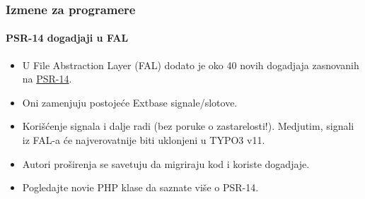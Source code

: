 \begin{frame}[fragile]
	\frametitle{Izmene za programere}
	\framesubtitle{PSR-14 dogadjaji u FAL}

	\lstset{basicstyle=\tiny\ttfamily}

	\begin{itemize}
		\item U File Abstraction Layer (FAL) dodato je oko 40 novih dogadjaja zasnovanih na
			\href{https://www.php-fig.org/psr/psr-14/}{PSR-14}.
		\item Oni zamenjuju postojeće Extbase signale/slotove.
		\item Korišćenje signala i dalje radi (bez poruke o zastarelosti!).
			Medjutim, signali iz FAL-a će najverovatnije biti uklonjeni u TYPO3 v11.
		\item Autori proširenja se savetuju da migriraju kod i koriste dogadjaje.
		\item Pogledajte novie PHP klase da saznate više o PSR-14.
	\end{itemize}

\end{frame}



